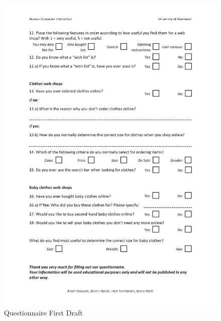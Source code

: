 \begin{figure}[H]
\begin{center}
\includegraphics[scale=0.75]{User_Involvement_Methods/Questionnaires/Questionnaire_Web_Shops_v2_2.png}
\caption{Questionnaire First Draft}
\label{fig:draft}
\end{center}
\end{figure}
\newpage

